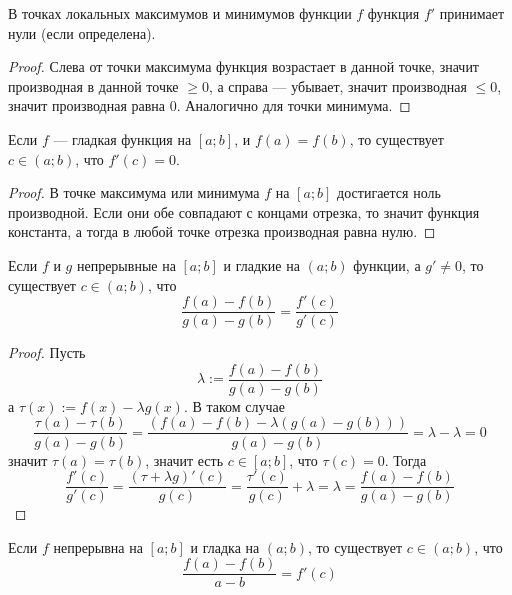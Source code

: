 \documentclass[12pt,a4paper]{article}
\begin{document}
    \begin{theorem}
        В точках локальных максимумов и минимумов функции $f$ функция $f'$ принимает нули (если определена).
    \end{theorem}

    \begin{proof}
        Слева от точки максимума функция возрастает в данной точке, значит производная в данной точке $\geqslant 0$, а справа --- убывает, значит производная $\leqslant 0$, значит производная равна $0$. Аналогично для точки минимума.
    \end{proof}

    \begin{theorem}[Ролль]
        Если $f$ --- гладкая функция на $[a; b]$, и $f(a) = f(b)$, то существует $c \in (a; b)$, что $f'(c) = 0$.
    \end{theorem}

    \begin{proof}
        В точке максимума или минимума $f$ на $[a;b]$ достигается ноль производной. Если они обе совпадают с концами отрезка, то значит функция константа, а тогда в любой точке отрезка производная равна нулю.
    \end{proof}

    \begin{theorem}
        Если $f$ и $g$ непрерывные на $[a; b]$ и гладкие на $(a; b)$ функции, а $g' \neq 0$, то существует $c \in (a; b)$, что
        \[\frac{f(a) - f(b)}{g(a) - g(b)} = \frac{f'(c)}{g'(c)}\]
    \end{theorem}

    \begin{proof}
        Пусть
        \[\lambda := \frac{f(a) - f(b)}{g(a) - g(b)}\]
        а $\tau(x) := f(x) - \lambda g(x)$. В таком случае
        \[\frac{\tau(a) - \tau(b)}{g(a) - g(b)} = \frac{(f(a) - f(b) - \lambda (g(a) - g(b)))}{g(a) - g(b)} = \lambda - \lambda = 0\]
        значит $\tau(a) = \tau(b)$, значит есть $c \in [a; b]$, что $\tau(c) = 0$. Тогда
        \[\frac{f'(c)}{g'(c)} = \frac{(\tau + \lambda g)'(c)}{g(c)} = \frac{\tau'(c)}{g(c)} + \lambda = \lambda = \frac{f(a) - f(b)}{g(a) - g(b)}\]
    \end{proof}

    \begin{theorem}[Лагранж]
        Если $f$ непрерывна на $[a; b]$ и гладка на $(a; b)$, то существует $c \in (a; b)$, что
        \[\frac{f(a) - f(b)}{a - b} = f'(c)\]
    \end{theorem}
\end{document}
